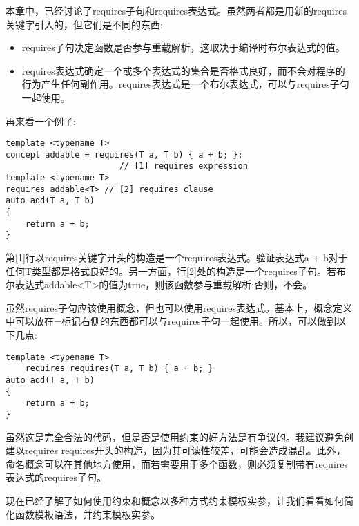 本章中，已经讨论了requires子句和requires表达式。虽然两者都是用新的requires关键字引入的，但它们是不同的东西:

\begin{itemize}
\item
requires子句决定函数是否参与重载解析，这取决于编译时布尔表达式的值。

\item
requires表达式确定一个或多个表达式的集合是否格式良好，而不会对程序的行为产生任何副作用。requires表达式是一个布尔表达式，可以与requires子句一起使用。
\end{itemize}

再来看一个例子:

\begin{lstlisting}[style=styleCXX]
template <typename T>
concept addable = requires(T a, T b) { a + b; };
                       // [1] requires expression
template <typename T>
requires addable<T> // [2] requires clause
auto add(T a, T b)
{
	return a + b;
}
\end{lstlisting}

第[1]行以requires关键字开头的构造是一个requires表达式。验证表达式a + b对于任何T类型都是格式良好的。另一方面，行[2]处的构造是一个requires子句。若布尔表达式addable<T>的值为true，则该函数参与重载解析;否则，不会。

虽然requires子句应该使用概念，但也可以使用requires表达式。基本上，概念定义中可以放在=标记右侧的东西都可以与requires子句一起使用。所以，可以做到以下几点:

\begin{lstlisting}[style=styleCXX]
template <typename T>
	requires requires(T a, T b) { a + b; }
auto add(T a, T b)
{
	return a + b;
}
\end{lstlisting}

虽然这是完全合法的代码，但是否是使用约束的好方法是有争议的。我建议避免创建以requires requires开头的构造，因为其可读性较差，可能会造成混乱。此外，命名概念可以在其他地方使用，而若需要用于多个函数，则必须复制带有requires表达式的requires子句。

现在已经了解了如何使用约束和概念以多种方式约束模板实参，让我们看看如何简化函数模板语法，并约束模板实参。




































































